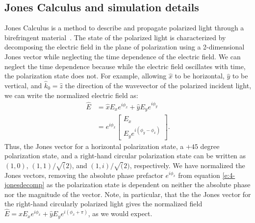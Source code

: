 \subsection{Jones Calculus and simulation details}
Jones Calculus is a method to describe and propagate polarized light through a birefringent material~\cite{RN232}.
The state of the polarized light is characterized by decomposing the electric field in the plane of polarization using a 2-dimensional Jones vector while neglecting the time dependence of the electric field.
We can neglect the time dependence because while the electric field oscillates with time, the polarization state does not.
For example, allowing $\hat{x}$ to be horizontal, $\hat{y}$ to be vertical, and $\hat{k}_0 = \hat{z}$ the direction of the wavevector of the polarized incident light, we can write the normalized electric field as:
\begin{align}
\hat{E} &=  \hat{x}E_x e^{i \phi _x} + \hat{y} E_y e^{i \phi _y}\\  &= e^{i \phi _x} \left[ \begin{array}{c} E_x \\E_y e^{i(\phi _y - \phi _x)}      \end{array} \right]. \label{e:4-jonesdecomp}
\end{align}
Thus, the Jones vector for a horizontal polarization state, a $+45$ degree polarization state, and a right-hand circular polarization state can be written as $(1,0)$, $(1,1)/\sqrt(2)$, and $(1,i)/\sqrt(2)$, respectively.
We have normalized the Jones vectors, removing the absolute phase prefactor $e^{i \phi _x}$ from equation \ref{e:4-jonesdecomp} as the polarization state is dependent on neither the absolute phase nor the magnitude of the vector.
Note, in particular, that the the Jones vector for the right-hand circularly polarized light gives the normalized field $\hat{E} = \hat{x}E_x e^{i \phi _x} + \hat{y} E_y e^{i( \phi _x+\pi)}$, as we would expect.

